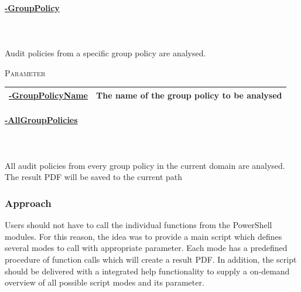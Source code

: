 \begin{tcolorbox}
    \paragraph{\underline{-GroupPolicy}} \ \\\\ Audit policies from a specific group policy are analysed.
    \vspace{0.3cm}
    \begin{center}
        \textsc{Parameter}
    \end{center}
    \vspace{-0.5cm}
    \begin{table}[H]
        \def\arraystretch{2}
        \centering
        \begin{tabular}{ p{4cm}  p{10cm} } \hline
            \textbf{\underline{-GroupPolicyName}} & The name of the group policy to be analysed \\ \hline
        \end{tabular}
    \end{table}
\end{tcolorbox}

\begin{tcolorbox}
    \paragraph{\underline{-AllGroupPolicies}} \ \\\\
    All audit policies from every group policy in the current domain are analysed.\\
    The result PDF will be saved to the current path
\end{tcolorbox}

\subsubsection{Approach}
Users should not have to call the individual functions from the PowerShell modules. For this reason, the idea was to provide a main script which defines several modes to call with appropriate parameter. Each mode has a predefined procedure of function calls which will create a result PDF. In addition, the script should be delivered with a integrated help functionality to supply a on-demand overview of all possible script modes and its parameter. 

